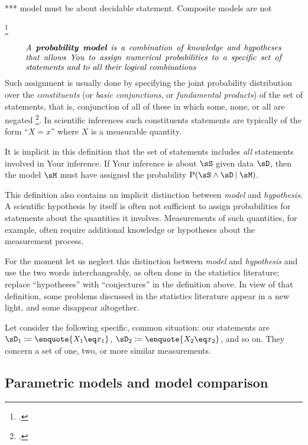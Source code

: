 \documentclass[\ifafour a4paper,12pt,\else a5paper,10pt,\fi%
onecolumn,oneside,article,%
british%
]{memoir}
\theoremstyle{remark}
\theoremstyle{innote}
\newcommand*{\citep}{\footcites}
\newcommand*{\defd}{\coloneqq}
\newcommand*{\p}{\mathrm{P}}%
\renewcommand*{\|}[1][]{\nonscript\,#1\vert\nonscript\;\mathopen{}}
\newcommand*{\sect}{\S}%
\newcommand*{\chap}{ch.}%
\begin{document}
*** model must be about decidable statement. Composite models are not


\citep[\sect~1.2]{hailperin2011}

\begin{equation}
  \parbox{0.9\linewidth}{\emph{A \textbf{probability model} is a combination of knowledge and hypotheses that allows You to assign numerical probabilities to a specific set of statements and to all their logical combinations}}
\label{eq:def_model}
\end{equation}
Such assignment is usually done by specifying the joint probability
distribution over the \emph{constituents} (or \emph{basic conjunctions}, or
\emph{fundamental products}) of the set of statements, that is, conjunction
of all of these in which some, none, or all are negated
\citep[\chap~0]{hailperin1996,hailperin2011}. In scientific inferences such
constituents statements are typically of the form \enquote{$X=x$} where $X$
is a measurable quantity.

It is implicit in this definition that the set of statements includes
\emph{all} statements involved in Your inference. If Your inference is
about $\sS$ given data $\sD$, then the model $\sM$ must have assigned the
probability $\p(\sS \land \sD \| \sM)$.

This definition also contains an implicit distinction between \emph{model}
and \emph{hypothesis}. A scientific hypothesis by itself is often not
sufficient to assign probabilities for statements about the quantities it
involves. Measurements of such quantities, for example, often require
additional knowledge or hypotheses about the measurement process.

For the moment let us neglect this distinction between \emph{model} and
\emph{hypothesis} and use the two words interchangeably, as often done in
the statistics literature; replace \enquote{hypotheses} with
\enquote{conjectures} in the definition above. In view of that definition,
some problems discussed in the statistics literature appear in a new light,
and some disappear altogether.

Let consider the following specific, common situation: our statements are
$\sD_{1} \defd \enquote{X_{1}\eq x_{1}}$,
$\sD_{2} \defd \enquote{X_{2}\eq x_{2}}$, and so on. They concern a set of
one, two, or more similar measurements.

\subsection{Parametric models and model comparison}
\label{sec:param_mods}
\end{document}
